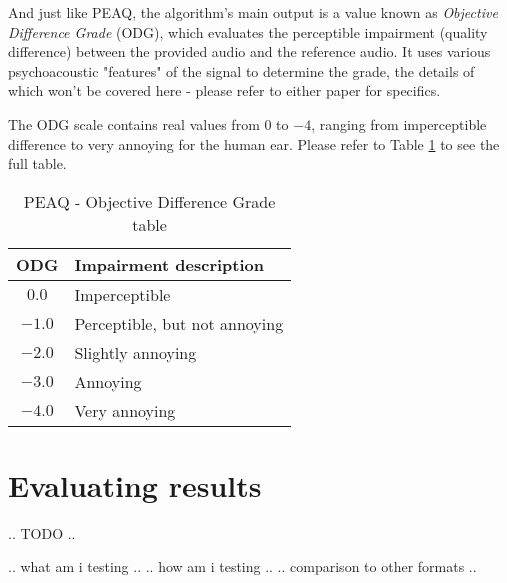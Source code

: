 And just like PEAQ, the algorithm's main output is a value known as \emph{Objective Difference Grade} (ODG), which evaluates the perceptible impairment (quality difference) between the provided audio and the reference audio. It uses various psychoacoustic "features" of the signal to determine the grade, the details of which won't be covered here - please refer to either paper for specifics.

The ODG scale contains real values from $0$ to $-4$, ranging from imperceptible difference to very annoying for the human ear. Please refer to Table \ref{tab:odg_scale} to see the full table.

\begin{table}[htbp]\caption{PEAQ - Objective Difference Grade table}
	\label{tab:odg_scale}
	\centering
	\begin{tabular}{|c|l|}
		\hline
		ODG & Impairment description \\ \hline
		$0.0$ & Imperceptible \\
		$-1.0$ & Perceptible, but not annoying \\
		$-2.0$ & Slightly annoying \\
		$-3.0$ & Annoying \\
		$-4.0$ & Very annoying \\
		\hline
	\end{tabular}
\end{table}

\section{Evaluating results}
.. TODO ..

.. what am i testing ..
.. how am i testing ..
.. comparison to other formats ..
